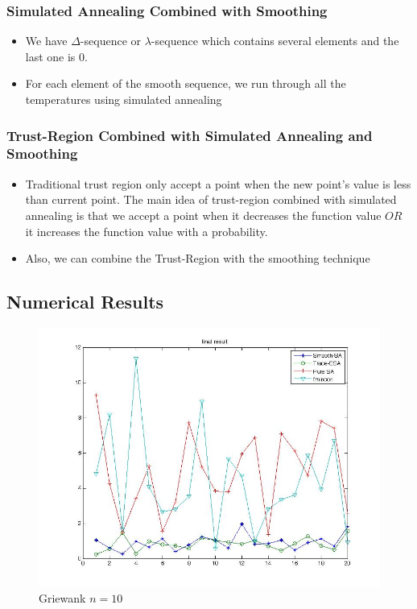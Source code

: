 \documentclass[hyperref={pdfpagelabels=false}]{beamer}
\begin{document}

\begin{frame}
\frametitle{Simulated Annealing Combined with Smoothing}
\begin{itemize}
\item We have $\Delta$-sequence or $\lambda$-sequence which contains several elements and the last one is 0. 
\item For each element of the smooth sequence, we run through all the temperatures using simulated annealing 
\end{itemize}
\end{frame}


\begin{frame}
\frametitle{Trust-Region Combined with Simulated Annealing and Smoothing}
\begin{itemize}
\item Traditional trust region only accept a point when the new point's value is less than current point. The main idea of trust-region combined with simulated annealing is that we accept a point when it decreases the function value $OR$ it increases the function value with a probability. 
\item Also, we can combine the Trust-Region with the smoothing technique
\end{itemize}
\end{frame}

\subsection{Numerical Results}

\begin{frame}
\begin{figure}
\includegraphics[scale=0.33]{result1.jpg}
\caption{Griewank $n=10$}
\end{figure}
\end{frame}
\end{document}
